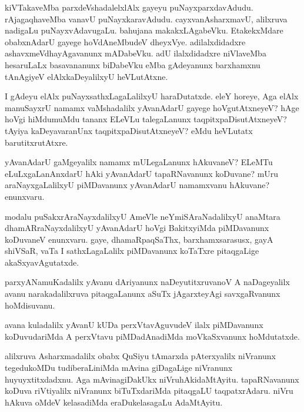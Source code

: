\documentclass{article}
\begin{document}
\begin{mn}%
kiVTakaveMba parxdeVshadalelxlAlx gayeyu
puNayxparxdavAdudu. rAjagaqhaveMba vanavU
puNayxkaravAdudu. cayxvanAsharxmavU, alilxruva nadigaLu
puNayxvAdavugaLu. bahujana makakxLAgabeVku. EtakekxMdare obabxnAdarU
gayege hoVdAneMbudeV dheyxVye. adilalxdidadxre ashavxmeVdhayAgavanunx
mADabeVku. adU ilalxdidadxre niVlaveMba hesaruLaLx basavananunx
biDabeVku eMba gAdeyanunx barxhamxnu tAnAgiyeV elAlxkaDeyalilxyU heVLutAtxne.
\end{mn}

\begin{mn}%
I gAdeyu elAlx puNayxsathxLagaLalilxyU haraDutatxde. eleY horeye, Aga
elAlx manuSayxrU namamx vaMshadalilx yAvanAdarU gayege hoVgutAtxneyeV?
hAge hoVgi hiMdumuMdu tananx ELeVLu talegaLanunx
taqpitxpaDisutAtxneyeV? tAyiya kaDeyavaranUnx taqpitxpaDisutAtxneyeV?
eMdu heVLutatx barutitxrutAtxre.
\end{mn}

\begin{mn}%
yAvanAdarU gaMgeyalilx namamx mULegaLanunx hAkuvaneV? ELeMTu
eLuLxgaLanAnxdarU hAki yAvanAdarU tapaRNavanunx koDuvane? mUru
araNayxgaLalilxyU piMDavanunx yAvanAdarU namamxvanu hAkuvane? enunxvaru.
\end{mn}

\begin{mn}%
modalu puSakxrAraNayxdalilxyU AmeVle neYmiSAraNadalilxyU anaMtara
dhamARraNayxdalilxyU yAvanAdarU hoVgi BakitxyiMda piMDavanunx
koDuvaneV enunxvaru. gaye, dhamaRpaqSaThx, barxhamxsarasusx, gayA
shiVSaR, vaTa I sathxLagaLalilx piMDavanunx koTaTxre pitaqgaLige akaSxyavAgutatxde.
\end{mn}

\begin{mn}
parxyANamuKadalilx yAvanu dAriyanunx naDeyutitxruvanoV A naDageyalilx
avanu narakadalilxruva pitaqgaLanunx aSuTx jAgarxteyAgi savxgaRvanunx hoMdisuvanu.
\end{mn}

\begin{mn}%
avana kuladalilx yAvanU kUDa perxVtavAguvudeV ilalx piMDavanunx
koDuvudariMda A perxVtavu piMDadAnadiMda moVkaSxvanunx hoMdutatxde.
\end{mn}

\begin{mn}
alilxruva Asharxmadalilx obabx QuSiyu tAmarxda pAterxyalilx niVranunx
tegedukoMDu tudiberaLiniMda mAvina giDagaLige niVranunx
huyuyxtitxdadxnu. Aga mAvinagiDakUkx
niVruhAkidaMtAyitu. tapaRNavanunx koDuva riVtiyalilx niVranunx
biTuTxdariMda pitaqgaLU taqpatxrAdaru. niVru hAkuva oMdeV kelasadiMda
eraDukelasagaLu AdaMtAyitu.
\end{mn}
\end{document}
